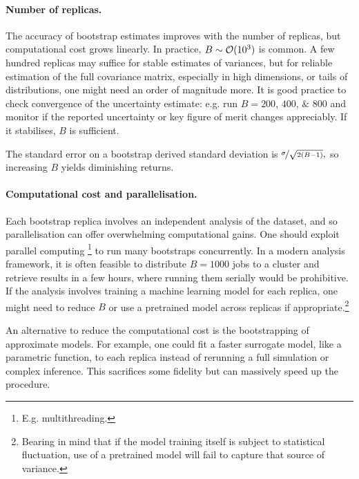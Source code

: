         \paragraph{Number of replicas.}
            The accuracy of bootstrap estimates improves with the number of replicas, but computational cost grows linearly.
            In practice, $B\sim{\mathcal O}(\num{d3})$ is common.
            A few hundred replicas may suffice for stable estimates of variances, but for reliable estimation of the full covariance matrix, especially in high dimensions, or tails of distributions, one might need an order of magnitude more.
            It is good practice to check convergence of the uncertainty estimate: e.g. run \(B = \numlist{200;400;800}\) and monitor if the reported uncertainty or key figure of merit changes appreciably.
            If it stabilises, $B$ is sufficient.
            
            The standard error on a bootstrap derived standard deviation is $\nicefrac{\sigma}{\sqrt{2(B-1)}},$ so increasing \(B\) yields diminishing returns.
        \paragraph{Computational cost and parallelisation.}
            Each bootstrap replica involves an independent analysis of the dataset, and so parallelisation can offer overwhelming computational gains.
            One should exploit parallel computing \footnote{E.g. multithreading.} to run many bootstraps concurrently.
            In a modern analysis framework, it is often feasible to distribute $B=\num{1000}$ jobs to a cluster and retrieve results in a few hours, where running them serially would be prohibitive.
            If the analysis involves training a machine learning model for each replica, one might need to reduce $B$ or use a pretrained model across replicas if appropriate.\footnote{Bearing in mind that if the model training itself is subject to statistical fluctuation, use of a pretrained model will fail to capture that source of variance.}
            
            An alternative to reduce the computational cost is the bootstrapping of approximate models.
            For example, one could fit a faster surrogate model, like a parametric function, to each replica instead of rerunning a full simulation or complex inference.
            This sacrifices some fidelity but can massively speed up the procedure.
